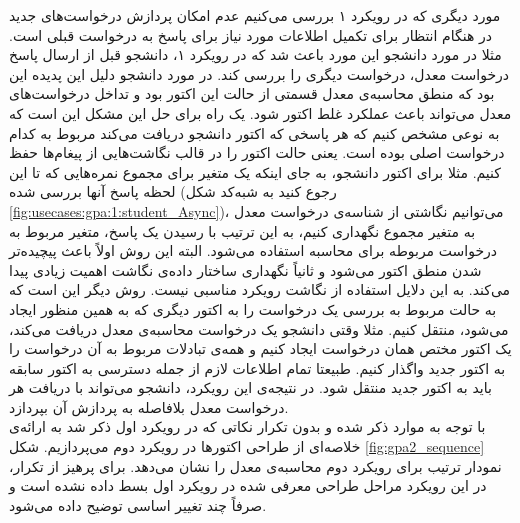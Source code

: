 مورد دیگری که در رویکرد ۱ بررسی می‌کنیم عدم امکان پردازش درخواست‌های جدید در هنگام انتظار برای تکمیل اطلاعات مورد نیاز برای پاسخ به درخواست قبلی است. مثلا در مورد دانشجو این مورد باعث شد که در رویکرد ۱، دانشجو قبل از ارسال پاسخ درخواست معدل،‌ درخواست دیگری را بررسی کند. در مورد دانشجو دلیل این پدیده این بود که منطق محاسبه‌ی معدل قسمتی از حالت این اکتور بود و تداخل درخواست‌های معدل می‌تواند باعث عملکرد غلط اکتور شود. یک راه برای حل این مشکل این است که به نوعی مشخص کنیم که هر پاسخی که اکتور دانشجو دریافت می‌کند مربوط به کدام درخواست اصلی بوده‌ است. یعنی حالت اکتور را در قالب نگاشت‌هایی از پیغام‌ها حفظ کنیم. مثلا برای اکتور دانشجو، به جای اینکه یک متغیر برای مجموع نمره‌هایی که تا این لحظه پاسخ آنها بررسی شده (رجوع کنید به شبه‌کد شکل \ref{fig:usecases:gpa:1:student_Async})، می‌توانیم نگاشتی از شناسه‌ی درخواست معدل به متغیر مجموع نگهداری کنیم، به این ترتیب با رسیدن یک پاسخ، متغیر مربوط به درخواست مربوطه برای محاسبه استفاده می‌شود. البته این روش اولاً باعث پیچیده‌تر شدن منطق اکتور می‌شود و ثانیاً نگهداری ساختار داده‌ی نگاشت اهمیت زیادی پیدا می‌کند. به این دلایل استفاده از نگاشت رویکرد مناسبی نیست. روش دیگر این است که به حالت مربوط به بررسی یک درخواست را به اکتور دیگری که به همین منظور ایجاد می‌شود، منتقل کنیم. مثلا وقتی دانشجو یک درخواست محاسبه‌ی معدل دریافت می‌کند، یک اکتور مختص همان درخواست ایجاد کنیم و همه‌ی تبادلات مربوط به آن درخواست را به اکتور جدید واگذار کنیم. طبیعتا تمام اطلاعات لازم از جمله دسترسی به اکتور سابقه باید به اکتور جدید منتقل شود. در نتیجه‌ی این رویکرد، دانشجو می‌تواند با دریافت هر درخواست معدل بلافاصله به پردازش آن بپردازد.\\
با توجه به موارد ذکر شده و بدون تکرار نکاتی که در رویکرد اول ذکر شد به ارائه‌ی خلاصه‌ای از طراحی اکتورها در رویکرد دوم می‌پردازیم.
شکل \ref{fig:gpa2_sequence} نمودار ترتیب برای رویکرد دوم محاسبه‌ی معدل را نشان ‌می‌دهد. برای پرهیز از تکرار، در این رویکرد مراحل طراحی معرفی شده در رویکرد اول بسط داده نشده است و صرفاً چند تغییر اساسی توضیح داده می‌شود.

